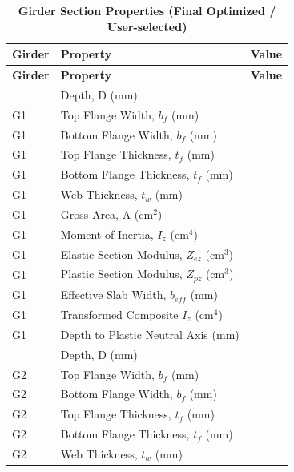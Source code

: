 \documentclass[12pt,a4paper]{report}
\numberwithin{table}{chapter}
\numberwithin{figure}{chapter}
\newcommand{\ReportTableGap}{\vspace{1em}}
\begin{document}
\ReportTableGap
\begin{longtable}{|C{2.5cm}|L{8.0cm}|>{\centering\arraybackslash}p{5.0cm}|}
\caption{\textbf{Girder Section Properties (Final Optimized / User-selected)}}\\
\hline
\textbf{Girder} & \textbf{Property} & \textbf{Value} \\[6pt]
\hline
\endfirsthead
\hline
\textbf{Girder} & \textbf{Property} & \textbf{Value} \\[6pt]
\hline
\endhead

 & \textnormal{Depth, D (mm)} &  \\[6pt]
G1 & \textnormal{Top Flange Width, $b_f$ (mm)} &  \\[6pt]
G1 & \textnormal{Bottom Flange Width, $b_f$ (mm)} &  \\[6pt]
G1 & \textnormal{Top Flange Thickness, $t_f$ (mm)} &  \\[6pt]
G1 & \textnormal{Bottom Flange Thickness, $t_f$ (mm)} &  \\[6pt]
G1 & \textnormal{Web Thickness, $t_w$ (mm)} &  \\[6pt]
G1 & \textnormal{Gross Area, A (cm$^2$)} &  \\[6pt]
G1 & \textnormal{Moment of Inertia, $I_z$ (cm$^4$)} &  \\[6pt]
G1 & \textnormal{Elastic Section Modulus, $Z_{ez}$ (cm$^3$)} &  \\[6pt]
G1 & \textnormal{Plastic Section Modulus, $Z_{pz}$ (cm$^3$)} &  \\[6pt]
G1 & \textnormal{Effective Slab Width, $b_{eff}$ (mm)} &  \\[6pt]
G1 & \textnormal{Transformed Composite $I_z$ (cm$^4$)} &  \\[6pt]
G1 & \textnormal{Depth to Plastic Neutral Axis (mm)} &  \\[6pt]
\hline
{} & \textnormal{Depth, D (mm)} &  \\[6pt]
G2 & \textnormal{Top Flange Width, $b_f$ (mm)} &  \\[6pt]
G2 & \textnormal{Bottom Flange Width, $b_f$ (mm)} &  \\[6pt]
G2 & \textnormal{Top Flange Thickness, $t_f$ (mm)} &  \\[6pt]
G2 & \textnormal{Bottom Flange Thickness, $t_f$ (mm)} &  \\[6pt]
G2 & \textnormal{Web Thickness, $t_w$ (mm)} &  \\[6pt]

\end{longtable}
\end{document}
